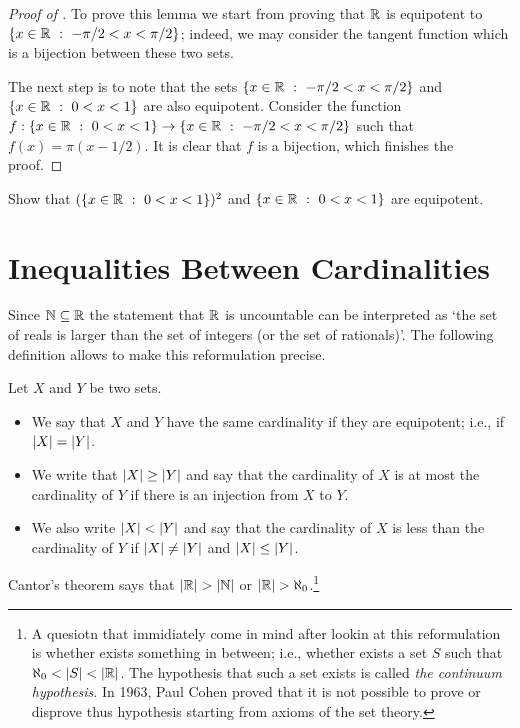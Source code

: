 \begin{proof}[Proof of ]
  To prove this lemma we start from proving that ${\mathbb{R}}$ is equipotent to 
  $\set[-\pi / 2 < x < \pi / 2]{x \in \R}$; indeed, we may consider the tangent
  function which is a bijection between these two sets.

  The next step is to note that the sets $\set[-\pi / 2 < x < \pi / 2]{x \in \R}$ and 
  $\set[0 < x < 1]{x \in \R}$ are also equipotent. Consider the function 
  $f : \set[0 < x < 1]{x \in \R} \to \set[-\pi / 2 < x < \pi / 2]{x \in \R}$
  such that $f(x) = \pi (x - 1 / 2)$. It is clear that $f$ is a bijection, which
  finishes the proof.
\end{proof}

\begin{exercise}
  Show that $(\set[0 < x < 1]{x \in \R})^2$ and $\set[0 < x < 1]{x \in \R}$ are equipotent.
\end{exercise}

\section{Inequalities Between Cardinalities}
Since ${\mathbb{N}} \subseteq {\mathbb{R}}$ the statement that ${\mathbb{R}}$ is uncountable can be
interpreted as `the set of reals is larger than the set of integers (or the set
of rationals)'. The following definition allows to make this reformulation
precise.
\begin{definition}
  Let $X$ and $Y$ be two sets. 
  \begin{itemize}
    \item We say that $X$ and $Y$ have the same cardinality if they are
      equipotent; i.e., if $\left|{X}\right| = \left|{Y}\right|$.
    \item We write that $\left|{X}\right| \ge \left|{Y}\right|$ and say that the
      cardinality of $X$ is at most the cardinality of $Y$ if there is an
      injection from $X$ to $Y$.
    \item We also write $\left|{X}\right| < \left|{Y}\right|$ and say that the
      cardinality of $X$ is less than the cardinality of $Y$ if 
      $\left|{X}\right| \neq \left|{Y}\right|$ and $\left|{X}\right| \le
      \left|{Y}\right|$.
  \end{itemize}
\end{definition}
Cantor's theorem says that $\left|{{\mathbb{R}}}\right| > \left|{{\mathbb{N}}}\right|$ or
$\left|{{\mathbb{R}}}\right| > \aleph_0$.\footnote{%
  A quesiotn that immidiately come in mind after lookin at this reformulation is
  whether exists something in between; i.e., whether exists a set $S$ such that
  $\aleph_0 < \left|{S}\right| < \left|{{\mathbb{R}}}\right|$. The hypothesis that such a
  set exists is called \emph{the continuum hypothesis}. In 1963, Paul Cohen
  proved that it is not possible to prove or disprove thus hypothesis starting
  from axioms of the set theory.
}

